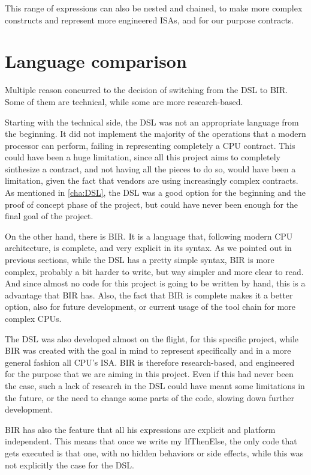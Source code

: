This range of expressions can also be nested and chained, to make more complex constructs
and represent more engineered ISAs, and for our purpose contracts.

\section{Language comparison}
\label{cha:Language comparison} Multiple reason concurred to the decision of
switching from the DSL to BIR. Some of them are technical, while some are more
research-based.

Starting with the technical side, the DSL was not an appropriate language from the
beginning. It did not implement the majority of the operations that a modern
processor can perform, failing in representing completely a CPU contract. This
could have been a huge limitation, since all this project aims to completely sinthesize
a contract, and not having all the pieces to do so, would have been a limitation,
given the fact that vendors are using increasingly complex contracts. As mentioned
in \ref{cha:DSL}, the DSL was a good option for the beginning and the proof of
concept phase of the project, but could have never been enough for the final goal
of the project.

On the other hand, there is BIR. It is a language that, following modern CPU
architecture, is complete, and very explicit in its syntax. As we pointed out in
previous sections, while the DSL has a pretty simple syntax, BIR is more complex,
probably a bit harder to write, but way simpler and more clear to read. And
since almost no code for this project is going to be written by hand, this is a advantage
that BIR has. Also, the fact that BIR is complete makes it a better option, also
for future development, or current usage of the tool chain for more complex CPUs.

The DSL was also developed almost on the flight, for this specific project, while
BIR was created with the goal in mind to represent specifically and in a more general
fashion all CPU's ISA. BIR is therefore research-based, and engineered for the purpose
that we are aiming in this project. Even if this had never been the case, such a
lack of research in the DSL could have meant some limitations in the future, or
the need to change some parts of the code, slowing down further development.

BIR has also the feature that all his expressions are explicit and platform independent.
This means that once we write my IfThenElse, the only code that gets executed is
that one, with no hidden behaviors or side effects, while this was not explicitly
the case for the DSL.

